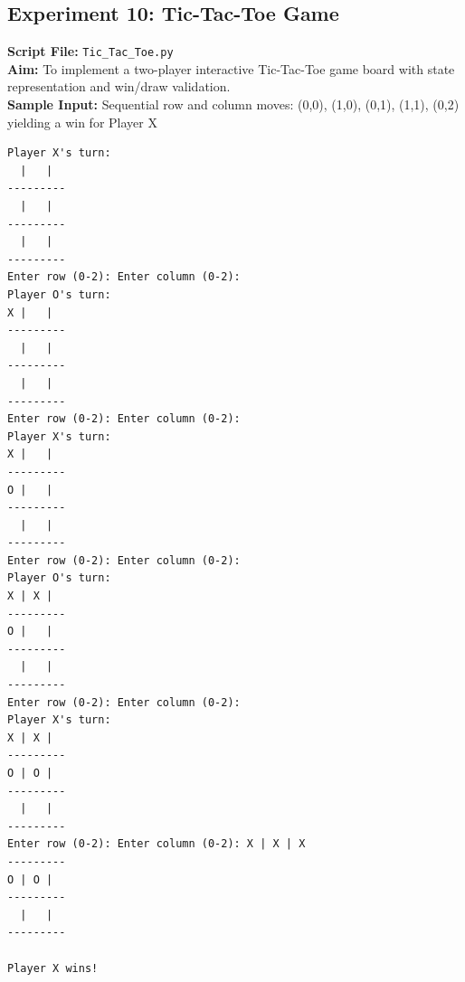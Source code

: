 \subsection*{Experiment 10: Tic-Tac-Toe Game}
\textbf{Script File:} \texttt{Tic_Tac_Toe.py} \\[4pt]
\textbf{Aim:} To implement a two-player interactive Tic-Tac-Toe game board with state representation and win/draw validation. \\[4pt]
\textbf{Sample Input:} Sequential row and column moves: (0,0), (1,0), (0,1), (1,1), (0,2) yielding a win for Player X \\[6pt]
\begin{tcolorbox}[colback=black!5!white,colframe=black!75!white,title=Terminal Execution Output - Tic-Tac-Toe Game]
\begin{verbatim}
Player X's turn:
  |   |  
---------
  |   |  
---------
  |   |  
---------
Enter row (0-2): Enter column (0-2): 
Player O's turn:
X |   |  
---------
  |   |  
---------
  |   |  
---------
Enter row (0-2): Enter column (0-2): 
Player X's turn:
X |   |  
---------
O |   |  
---------
  |   |  
---------
Enter row (0-2): Enter column (0-2): 
Player O's turn:
X | X |  
---------
O |   |  
---------
  |   |  
---------
Enter row (0-2): Enter column (0-2): 
Player X's turn:
X | X |  
---------
O | O |  
---------
  |   |  
---------
Enter row (0-2): Enter column (0-2): X | X | X
---------
O | O |  
---------
  |   |  
---------

Player X wins!
\end{verbatim}
\end{tcolorbox}

